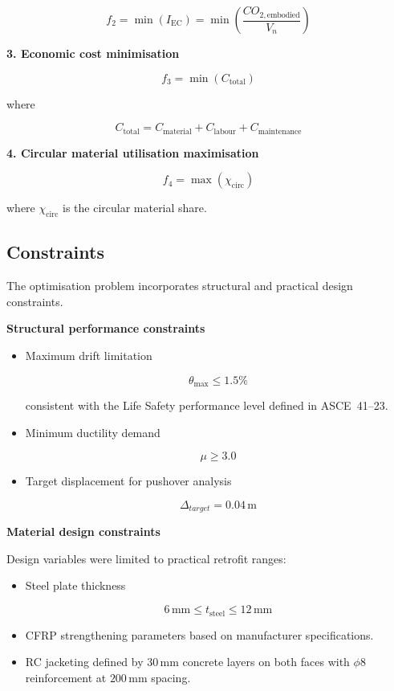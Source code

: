 \documentclass[fleqn,10pt]{wlscirep}
\begin{document}
\begin{equation}
f_2 =
\min(I_{\mathrm{EC}})
=
\min\left(\frac{CO_{2,\mathrm{embodied}}}{V_n}\right)
\end{equation}

\textbf{3. Economic cost minimisation}

\begin{equation}
f_3 =
\min(C_{\mathrm{total}})
\end{equation}

where

\[
C_{\mathrm{total}} =
C_{\mathrm{material}} + C_{\mathrm{labour}} + C_{\mathrm{maintenance}}
\]

\textbf{4. Circular material utilisation maximisation}

\begin{equation}
f_4 =
\max(\chi_{\mathrm{circ}})
\end{equation}

where $\chi_{\mathrm{circ}}$ is the circular material share.

\subsection{Constraints}

The optimisation problem incorporates structural and practical design constraints.

\textbf{Structural performance constraints}

\begin{itemize}

\item Maximum drift limitation

\[
\theta_{\max} \leq 1.5\%
\]

consistent with the Life Safety performance level defined in ASCE~41--23.

\item Minimum ductility demand

\[
\mu \geq 3.0
\]

\item Target displacement for pushover analysis

\[
\Delta_{target} = 0.04\,\mathrm{m}
\]

\end{itemize}

\textbf{Material design constraints}

Design variables were limited to practical retrofit ranges:

\begin{itemize}

\item Steel plate thickness

\[
6\,\mathrm{mm} \leq t_{\mathrm{steel}} \leq 12\,\mathrm{mm}
\]

\item CFRP strengthening parameters based on manufacturer specifications.

\item RC jacketing defined by $30\,\mathrm{mm}$ concrete layers on both faces with $\phi8$ reinforcement at $200\,\mathrm{mm}$ spacing.

\end{itemize}
\end{document}
